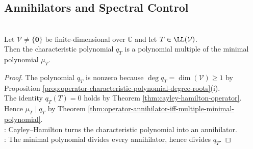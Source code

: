 \subsection{Annihilators and Spectral Control}
\begin{corollary} \label{cor:operator-characteristic-multiple-minimal-polynomial} \\
Let $\mathcal{V}\neq\{\mathbf{0}\}$ be finite-dimensional over $\mathbb{C}$ and let $T\in\LL(\mathcal{V})$.\\
Then the characteristic polynomial $q_T$ is a polynomial multiple of the minimal polynomial $\mu_T$.
\begin{proof}
The polynomial $q_T$ is nonzero because $\deg q_T=\dim(\mathcal{V})\geq1$ by Proposition \ref{prop:operator-characteristic-polynomial-degree-roots}(i).\\
The identity $q_T(T)=0$ holds by Theorem \ref{thm:cayley-hamilton-operator}. Hence $\mu_T\mid q_T$ by Theorem \ref{thm:operator-annihilator-iff-multiple-minimal-polynomial}.\\
: Cayley--Hamilton turns the characteristic polynomial into an annihilator.\\
: The minimal polynomial divides every annihilator, hence divides $q_T$.
\end{proof}
\end{corollary}

